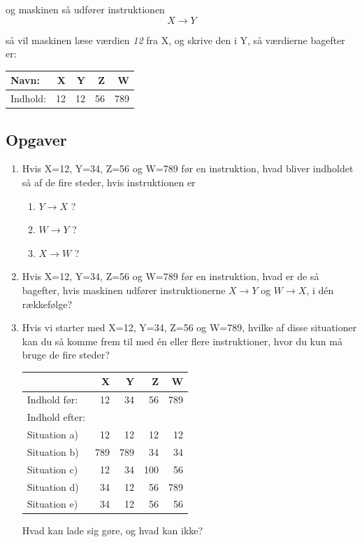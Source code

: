 \documentclass[a4paper]{article}
\begin{document}
\noindent
og maskinen så udfører instruktionen
$$X \to Y$$

\noindent
så vil maskinen læse værdien \emph{12} fra X, og skrive den i Y, så
værdierne bagefter er:

\begin{center}
\begin{tabular}{lrrrr}
Navn: & X & Y & Z & W\\
\hline
Indhold: & 12 & 12 & 56 & 789\\
\end{tabular}
\end{center}

\subsection*{Opgaver}
\begin{enumerate}
\item Hvis X=12, Y=34, Z=56 og W=789 før en instruktion, hvad bliver
  indholdet så af de fire steder, hvis instruktionen er
  \begin{enumerate}
  \item $Y \to X$ ?
  \item $W \to Y$ ?
  \item $X \to W$ ?
  \end{enumerate}

\item Hvis X=12, Y=34, Z=56 og W=789 før en instruktion, hvad er de så
  bagefter, hvis maskinen udfører instruktionerne $X \to Y$ og
  $W \to X$, i dén rækkefølge?


\item Hvis vi starter med X=12, Y=34, Z=56 og W=789, hvilke af disse
  situationer kan du så komme frem til med én eller flere
  instruktioner, hvor du kun må bruge de fire steder?

  \begin{center}
    \begin{tabular}{lrrrr}
      & X & Y & Z & W\\
      \hline
      Indhold før: & 12 & 34 & 56 & 789\\
      \hline
      Indhold efter:\\
      Situation a) & 12 & 12 & 12 & 12\\
      Situation b) & 789 & 789 & 34 & 34\\
      Situation c) & 12 & 34 & 100 & 56\\
      Situation d) & 34 & 12 & 56 & 789\\
      Situation e) & 34 & 12 & 56 & 56\\
    \end{tabular}
  \end{center}
  Hvad kan lade sig gøre, og hvad kan ikke?

\end{enumerate}
\end{document}
